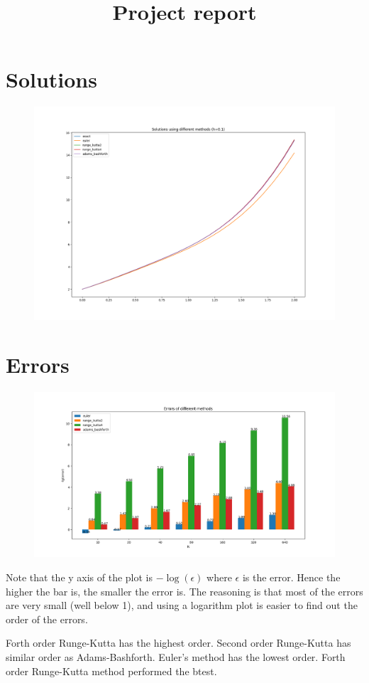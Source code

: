 \documentclass[a4paper]{article}
\title{Project report}
\author{}
\begin{document}
\maketitle

\section{Solutions}
\begin{figure}[H]
	\centering
	\includegraphics[width=\linewidth]{solutions.png}
\end{figure}

\section{Errors}
\begin{figure}[H]
	\centering
	\includegraphics[width=\linewidth]{errors.png}
\end{figure}

Note that the y axis of the plot is $-\log(\epsilon)$ where
$\epsilon$ is the error. Hence the higher the bar is, the smaller
the error is. The reasoning is that most of the errors are very small (well
below 1), and using a logarithm plot is easier to find out the order of the
errors.

Forth order Runge-Kutta has the highest order. Second order Runge-Kutta has
similar order as Adams-Bashforth. Euler's method has the lowest order. Forth
order Runge-Kutta method performed the btest.
\end{document}
